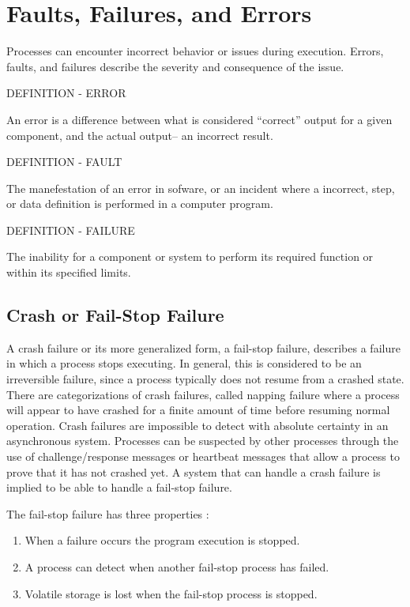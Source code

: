 \section{Faults, Failures, and Errors}

Processes can encounter incorrect behavior or issues during execution.
Errors, faults, and failures describe the severity and consequence of the issue.

DEFINITION - ERROR

An error is a difference between what is considered ``correct'' output for a given component, and the actual output-- an incorrect result.

DEFINITION - FAULT

The manefestation of an error in sofware, or an incident where a incorrect, step, or data definition is performed in a computer program.

DEFINITION - FAILURE

The inability for a component or system to perform its required function or within its specified limits.

\subsection{Crash or Fail-Stop Failure}

A crash failure or its more generalized form, a fail-stop failure, describes a failure in which a process stops executing.
In general, this is considered to be an irreversible failure, since a process typically does not resume from a crashed state.
There are categorizations of crash failures, called napping failure where a process will appear to have crashed for a finite amount of time before resuming normal operation.
Crash failures are impossible to detect with absolute certainty in an asynchronous system.
Processes can be suspected by other processes through the use of challenge/response messages or heartbeat messages that allow a process to prove that it has not crashed yet.
A system that can handle a crash failure is implied to be able to handle a fail-stop failure.\cite{DISTRIBUTED}

The fail-stop failure has three properties \cite{DISTRIBUTED}:

\begin{enumerate}
\item When a failure occurs the program execution is stopped.
\item A process can detect when another fail-stop process has failed.
\item Volatile storage is lost when the fail-stop process is stopped.
\end{enumerate}

